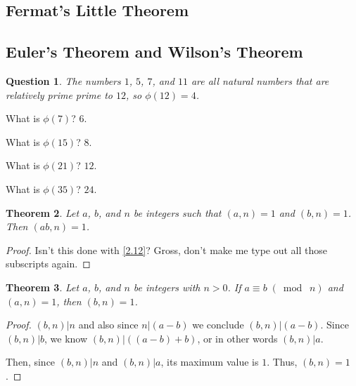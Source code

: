 \documentclass{article}
\newtheorem{thm}{Theorem}[section]
\newtheorem{ques}[thm]{Question}
\numberwithin{equation}{thm}
\providecommand{\gmod}[1]{\; (\bmod \; #1)}
\begin{document}



\subsection*{Fermat's Little Theorem}




\subsection*{Euler's Theorem and Wilson's Theorem}

\setcounter{thm}{26}

\begin{ques} \label{4.27}
  The numbers $1$, $5$, $7$, and $11$ are all natural numbers that are relatively prime prime to $12$, so $\phi (12) = 4$.
\end{ques}

What is $\phi (7)$? $6$.

What is $\phi (15)$? $8$.

What is $\phi (21)$? $12$.

What is $\phi (35)$? $24$.



\begin{thm} \label{4.28}
  Let $a$, $b$, and $n$ be integers such that $(a, n) = 1$ and $(b, n) = 1$. Then $(ab, n) = 1$.
\end{thm}

\begin{proof}
  Isn't this done with \ref{2.12}? Gross, don't make me type out all those subscripts again.
\end{proof}



\begin{thm} \label{4.29}
  Let $a$, $b$, and $n$ be integers with $n > 0$. If $a \equiv b \gmod n$ and $(a, n) = 1$, then $(b, n) = 1$.
\end{thm}

\begin{proof}
  $(b, n) | n$ and also since $n | (a - b)$ we conclude $(b, n) | (a - b)$. Since $(b, n) | b$, we know $(b, n) | ((a - b) + b)$, or in other words $(b, n) | a$.

  Then, since $(b, n) | n$ and $(b, n) | a$, its maximum value is $1$. Thus, $(b, n) = 1$.
\end{proof}
\end{document}
